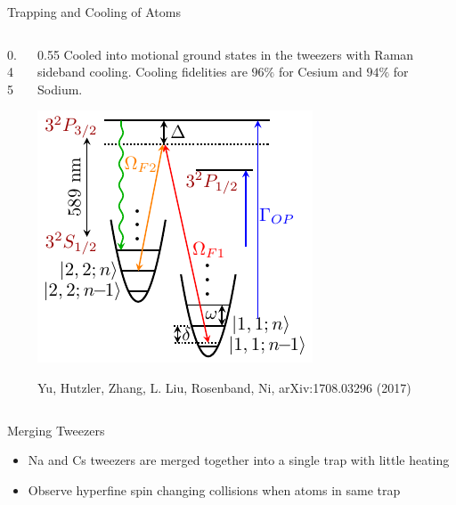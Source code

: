 \documentclass[final]{beamer}
\newlength{\coltwowid}
\begin{document}
\begin{frame}[t]
\begin{columns}[t]
\begin{column}{\coltwowid}
\begin{block}{Trapping and Cooling of Atoms}
\begin{columns}[T]
\begin{column}{0.45\coltwowid}
\begin{center}
\begin{tikzpicture}
              \end{tikzpicture}
            \end{center}
          \end{column}
          \begin{column}{0.55\coltwowid}
            Cooled into motional ground states in the tweezers with Raman sideband cooling.
            Cooling fidelities are $96\%$ for Cesium and $94\%$ for Sodium.
            \vspace{2ex}
            \begin{center}
              \includegraphics[width=0.47\coltwowid]{na-rsc-schematics}
            \end{center}
            {\small Yu, Hutzler, Zhang, L. Liu, Rosenband, Ni, arXiv:1708.03296 (2017)}
          \end{column}
        \end{columns}
      \end{block}
      \begin{block}{Merging Tweezers}
        \begin{itemize}
        \item Na and Cs tweezers are merged together into a single trap with little heating
        \item Observe hyperfine spin changing collisions when atoms in same trap
        \end{itemize}
        \begin{center}
          \begin{tikzpicture}

\end{tikzpicture}
\end{center}
\end{block}
\end{column}
\end{columns}
\end{frame}
\end{document}
